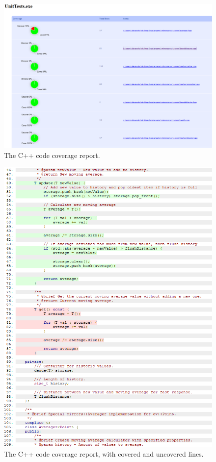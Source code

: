             \begin{figure}[!ht]
            	\centering
            	\includegraphics[width=\textwidth]{CPPCoveragePie}
            	\caption{The C++ code coverage report.}
            	\label{fig:cpppie}
            \end{figure}
            
            \begin{figure}[!ht]
                \centering
                \includegraphics[scale = 0.5]{CPPCoverageLines}
                \caption{The C++ code coverage report, with covered and uncovered lines.}
                \label{fig:cpplines}
            \end{figure}
			
